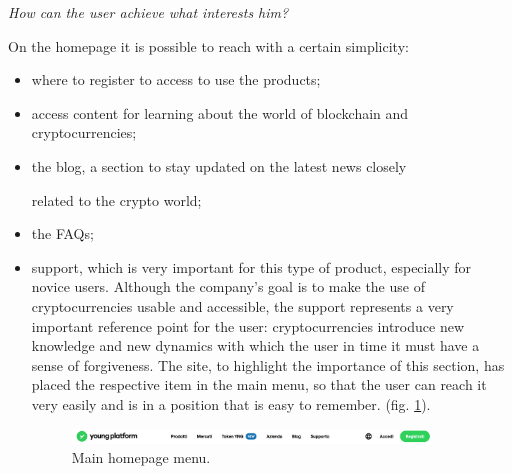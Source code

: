 \centerline{\textit{How can the user achieve what interests him?}}
On the homepage it is possible to reach with a certain simplicity:
\begin{itemize}
  \item where to register to access to use the products;

  \item access content for learning about the world of blockchain and 
  cryptocurrencies;

  \item the blog, a section to stay updated on the latest news closely 
  
  related to the crypto world;

  \item the FAQs;

  \item support, which is very important for this type of product, 
  especially for novice users. Although the company's goal is to make the 
  use of cryptocurrencies usable and accessible, the support represents a 
  very important reference point for the user: cryptocurrencies introduce 
  new knowledge and new dynamics with which the user in time it must have 
  a sense of forgiveness. The site, to highlight the importance of this 
  section, has placed the respective item in the main menu, so that the 
  user can reach it very easily and is in a position that is easy to 
  remember. (fig. \ref{fig:main-menu}).

  \begin{figure}[H]
    \centering
    \includegraphics[width=0.90\textwidth]{res/images/main-menu.png}
    \caption{Main homepage menu.}
    \label{fig:main-menu}
  \end{figure}
\end{itemize}

